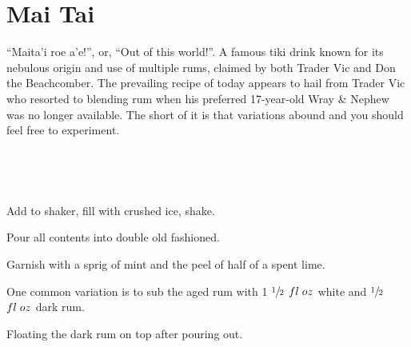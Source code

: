\section[Mai Tai]{Mai Tai}

\begin{recipestats}[
        servings=1,
        preptime=5 \minute,
        original=\citefield{cocktailSeminars2021}{title}~\cite{cocktailSeminars2021},
    ]
\end{recipestats}

\begin{recipeabstract}
    ``Maita'i roe a'e!'', or, ``Out of this world!''.
    A famous tiki drink known for its nebulous origin and use of multiple
    rums, claimed by both Trader Vic and Don the Beachcomber.
    The prevailing recipe of today appears to hail from Trader Vic who
    resorted to blending rum when his preferred 17-year-old Wray \& Nephew
    was no longer available.
    The short of it is that variations abound and you should feel free to experiment.

\end{recipeabstract}

\begin{ingredientcolumns}
    \begin{ingredientblock}
        \\
    \end{ingredientblock}
    \begin{ingredientblock}
        \\
    \end{ingredientblock}
\end{ingredientcolumns}

\begin{preparation}
\item Add to shaker, fill with crushed ice, shake.
\item Pour all contents into double old fashioned.
\item Garnish with a sprig of mint and the peel of half of a spent lime.
\end{preparation}

\begin{variation}
\item One common variation is to sub the aged rum with 1 $\sfrac{1}{2}$
    $fl\;oz$ white and $\sfrac{1}{2}$ $fl\;oz$ dark rum.
\item Floating the dark rum on top after pouring out.
\end{variation}

\recipeend
